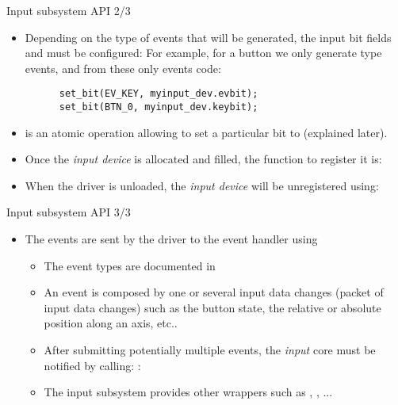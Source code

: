 \begin{frame}[fragile]{Input subsystem API 2/3}
  \begin{itemize}
  \item Depending on the type of events that will be generated, the
    input bit fields  and  must be configured:
    For example, for a button we only generate
     type events, and from these only  events
    code:
    \begin{block}{}
    \begin{verbatim}
      set_bit(EV_KEY, myinput_dev.evbit);
      set_bit(BTN_0, myinput_dev.keybit);
    \end{verbatim}
    \end{block}
  \item {} is an atomic operation allowing to set a particular bit
        to  (explained later).
  \item Once the {\em input device} is allocated and filled, the
    function to register it
    is: 
  \item When the driver is unloaded, the {\em input device} will be
    unregistered using:
  \end{itemize}
\end{frame}

\begin{frame}[fragile]{Input subsystem API 3/3}
  \begin{itemize}
  \item The events are sent by the driver to the event handler using
    \begin{itemize}
    \item The event types are documented in 
    \item An event is composed by one or several input data changes
      (packet of input data changes) such as the button state, the
      relative or absolute position along an axis, etc..
    \item After submitting potentially multiple events, the {\em
        input} core must be notified by calling:
      :
    \item The input subsystem provides other wrappers such as
      , , ...
    \end{itemize}
  \end{itemize}
\end{frame}

